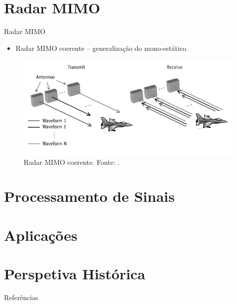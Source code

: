 \documentclass[portuguese]{beamer}
\begin{document}
\section{Radar MIMO}

\begin{frame}{Radar MIMO}
  \begin{itemize}
	\item Radar MIMO coerente -- generalização do mono-estático.
  \end{itemize}
  \begin{figure}[]
	\centering
	\includegraphics[width=0.7\linewidth]{../report/graphics/concept.png}
	\caption{Radar MIMO coerente. Fonte: \cite{mimoradarbook}.}
	\label{fig:concept}
  \end{figure}
\end{frame}



\section{Processamento de Sinais}

\section{Aplicações}

\section{Perspetiva Histórica}

\begin{frame}{Referências}
  \printbibliography
\end{frame}
\end{document}
